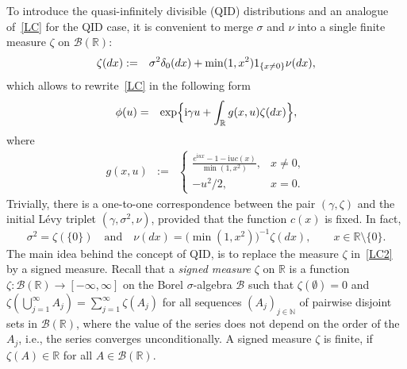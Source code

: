 \documentclass[a4paper,11pt]{article}
\theoremstyle{definition}
\newcommand{\I}{{\rm{1}}}
\newcommand{\R}{{\mathbb{R}}}
\newcommand{\1}{\mathbb{I}}
\renewcommand{\i}{\mathrm{i}}
\def\R{\mathbb{R}}
\newcommand{\B}{\mathcal{B}}%
\theoremstyle{remark}
\begin{document}
To introduce the quasi-infinitely divisible (QID) distributions and an analogue of~\eqref{LC} for the QID case, it is convenient to merge \(\sigma\) and \(\nu\) into a single finite measure  \(\zeta\) on \(\B(\R):\)
\begin{eqnarray*}
\zeta(dx) &:=& \sigma^2 \delta_0(dx) + \min(1,x^2) \I_ {\{ x\ne 0\}}\nu(dx), 
\end{eqnarray*}
which allows to rewrite~\eqref{LC} in the following form  
\begin{eqnarray} \label{LC2}
\phi(u) &=& \exp\Bigl\{ 
\i \gamma u+ \int_{\R} g(x,u) \zeta(dx)
\Bigr\}, 
\end{eqnarray}
where
\begin{eqnarray*}
g(x,u) &:=& \begin{cases} 
\frac{e^{\i u x}-1 - \i u c(x) }{\min(1, x^2)}, & x \ne 0,\\
-u^2 /2,  & x = 0.
\end{cases}  \end{eqnarray*}
Trivially, there is a one-to-one correspondence between the  pair $(\gamma, \zeta)$ and the initial L{\'e}vy triplet \((\gamma, \sigma^2, \nu)\), provided that the function $c(x)$ is fixed. In fact,
\begin{equation}
\label{zeta}
    \sigma^2 = \zeta(\{0\}) \quad \text{and} \quad \nu(dx) =  \bigl(\min(1, x^2)\bigr)^{-1}\zeta(dx), \qquad  x \in \R \setminus \{0\}.
\end{equation}
The main idea behind the concept of QID, is to replace the measure \(\zeta\) in~\eqref{LC2} by a signed measure.  Recall that 
a \textit{signed measure} $\zeta$ on $\mathbb{R}$ is a function $\zeta: \mathcal{B} (\R) \rightarrow [-\infty, \infty]$ on the Borel $\sigma$-algebra $\mathcal{B}$ such that
\(
    \zeta(\emptyset) = 0 \) and \(\zeta(\bigcup_{j=1}^{\infty}A_j) = \sum_{j=1}^{\infty} \zeta(A_j)
\)
for all sequences $(A_j)_{j \in \mathbb{N}}$ of pairwise disjoint sets in $\mathcal{B}(\R)$, where the   value of the series does not depend on the order of the $A_j$, i.e., the series converges unconditionally.  
A signed measure $\zeta$ is finite, if $\zeta(A) \in \mathbb{R}$ for all $A \in \mathcal{B}(\R)$. %
\end{document}
